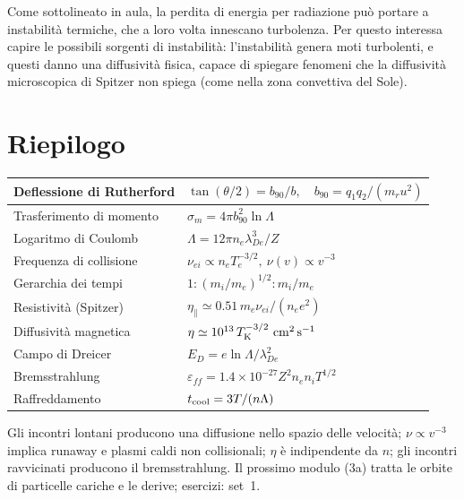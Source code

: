 Come sottolineato in aula, la perdita di energia per radiazione può portare a instabilità termiche, che a loro volta innescano turbolenza. Per questo interessa capire le possibili sorgenti di instabilità: l'instabilità genera moti turbolenti, e questi danno una diffusività fisica, capace di spiegare fenomeni che la diffusività microscopica di Spitzer non spiega (come nella zona convettiva del Sole).

\section{Riepilogo}
\begin{center}
\small
\begin{tabular}{|l|l|}
\hline
Deflessione di Rutherford & $\tan(\theta/2)=b_{90}/b,\quad b_{90}=q_1q_2/(m_ru^2)$\\
\hline
Trasferimento di momento & $\sigma_m=4\pi b_{90}^2\ln\Lambda$\\
\hline
Logaritmo di Coulomb & $\Lambda=12\pi n_e\lambda_{De}^3/Z$\\
\hline
Frequenza di collisione & $\nu_{ei}\propto n_eT_e^{-3/2},\ \nu(v)\propto v^{-3}$\\
\hline
Gerarchia dei tempi & $1:(m_i/m_e)^{1/2}:m_i/m_e$\\
\hline
Resistività (Spitzer) & $\eta_\parallel\simeq0.51\,m_e\nu_{ei}/(n_ee^2)$\\
\hline
Diffusività magnetica & $\eta\simeq10^{13}\,T_{\rm K}^{-3/2}\ \mathrm{cm^2\,s^{-1}}$\\
\hline
Campo di Dreicer & $E_D=e\ln\Lambda/\lambda_{De}^2$\\
\hline
Bremsstrahlung & $\varepsilon_{ff}=1.4\times10^{-27}Z^2n_en_iT^{1/2}$\\
\hline
Raffreddamento & $t_{\rm cool}=3T/(n\Lambda)$\\
\hline
\end{tabular}
\end{center}
Gli incontri lontani producono una diffusione nello spazio delle velocità; $\nu\propto v^{-3}$ implica runaway e plasmi caldi non collisionali; $\eta$ è indipendente da $n$; gli incontri ravvicinati producono il bremsstrahlung.
Il prossimo modulo (3a) tratta le orbite di particelle cariche e le derive; esercizi: set~1.

